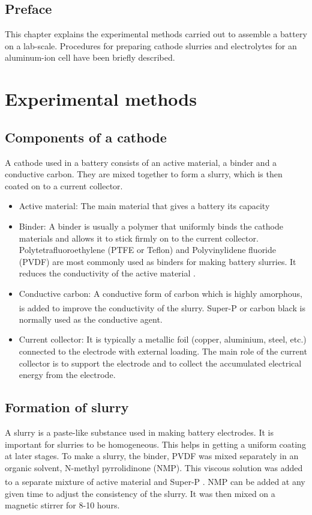 \section*{\centering Preface}
This chapter explains the experimental methods carried out to assemble a battery on a lab-scale. Procedures for preparing cathode slurries and electrolytes for an aluminum-ion cell have been briefly described. 
\pagebreak
\chapter{Experimental methods} %

\label{chap3} %

\section{Components of a cathode}
A cathode used in a battery consists of an active material, a binder and a conductive carbon. They are mixed together to form a slurry, which is then coated on to a current collector.  
\begin{itemize}
    \item Active material: The main material that gives a battery its capacity
    \item Binder: A binder is usually a polymer that uniformly binds the cathode materials and allows it to stick firmly on to the current collector. Polytetrafluoroethylene (PTFE or Teflon) and Polyvinylidene fluoride (PVDF) are most commonly used as binders for making battery slurries. It reduces the conductivity of the active  material \cite{grillet}. 
    \item Conductive carbon: A conductive form of carbon which is highly amorphous, is added to improve the conductivity of the slurry. Super-P\textsuperscript{\textregistered} or carbon black is normally used as the conductive agent. 
    \item Current collector: It is typically a metallic foil (copper, aluminium, steel, etc.) connected to the electrode with external loading. The main role of the current collector is to support the electrode and to collect the accumulated electrical energy from the electrode\cite{sun_effect_2017}.
\end{itemize}

\section{Formation of slurry}
A slurry is a paste-like substance used in making battery electrodes. It is important for slurries to be homogeneous. This helps in getting a uniform coating at later stages. To make a slurry, the binder, PVDF was mixed separately in an organic solvent, N-methyl pyrrolidinone (NMP). This viscous solution was added to a separate mixture of active material and Super-P\textsuperscript{\textregistered} . NMP can be added at any given time to adjust the consistency of the slurry. It was then mixed on a magnetic stirrer for 8-10 hours. 

